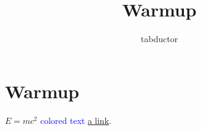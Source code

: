 \documentclass{article}
\begin{document}
\title{Warmup}
\author{tabductor}
\maketitle
\section{Warmup}
$E = mc^2$ \textcolor{blue}{colored text} \href{https://example.com}{a link}.
\end{document}
